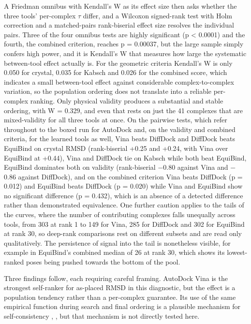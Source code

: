 A Friedman omnibus with Kendall's W as its effect size then asks whether the three tools' per-complex \ensuremath{\tau} differ, and a Wilcoxon signed-rank test with Holm correction and a matched-pairs rank-biserial effect size resolves the individual pairs. Three of the four omnibus tests are highly significant (p \textless{} 0.0001) and the fourth, the combined criterion, reaches p = 0.00037, but the large sample simply confers high power, and it is Kendall's W that measures how large the systematic between-tool effect actually is. For the geometric criteria Kendall's W is only 0.050 for crystal, 0.035 for Kabsch and 0.026 for the combined score, which indicates a small between-tool effect against considerable complex-to-complex variation, so the population ordering does not translate into a reliable per-complex ranking. Only physical validity produces a substantial and stable ordering, with W = 0.329, and even that rests on just the 41 complexes that are mixed-validity for all three tools at once. On the pairwise tests, which refer throughout to the boxed run for AutoDock and, on the validity and combined criteria, for the learned tools as well, Vina beats DiffDock and DiffDock beats EquiBind on crystal RMSD (rank-biserial +0.25 and +0.24, with Vina over EquiBind at +0.44), Vina and DiffDock tie on Kabsch while both beat EquiBind, EquiBind dominates both on validity (rank-biserial \ensuremath{-}0.80 against Vina and \ensuremath{-}0.86 against DiffDock), and on the combined criterion Vina beats DiffDock (p = 0.012) and EquiBind beats DiffDock (p = 0.020) while Vina and EquiBind show no significant difference (p = 0.432), which is an absence of a detected difference rather than demonstrated equivalence. One further caution applies to the tails of the curves, where the number of contributing complexes falls unequally across tools, from 303 at rank 1 to 149 for Vina, 285 for DiffDock and 302 for EquiBind at rank 30, so deep-rank comparisons rest on different subsets and are read only qualitatively. The persistence of signal into the tail is nonetheless visible, for example in EquiBind's combined median of 26 at rank 30, which shows its lowest-ranked poses being pushed towards the bottom of the pool.

Three findings follow, each requiring careful framing. AutoDock Vina is the strongest self-ranker for as-placed RMSD in this diagnostic, but the effect is a population tendency rather than a per-complex guarantee. Its use of the same empirical function during search and final ordering is a plausible mechanism for self-consistency \cite{ref022}, \cite{ref052}, but that mechanism is not directly tested here.

